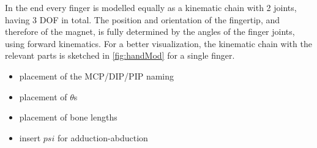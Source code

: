 In the end every finger is modelled equally as a kinematic chain with 2 joints, having 3 \ac{DOF} in total. The position and orientation of the fingertip, and therefore of the magnet, is fully determined by the angles of the finger joints, using forward kinematics. For a better visualization, the kinematic chain with the relevant parts is sketched in \ref{fig:handMod} for a single finger. \\
\begin{itemize}
\item placement of the MCP/DIP/PIP naming
\item placement of $ \theta $s
\item placement of bone lengths
\item insert $ psi $ for adduction-abduction
\end{itemize}

